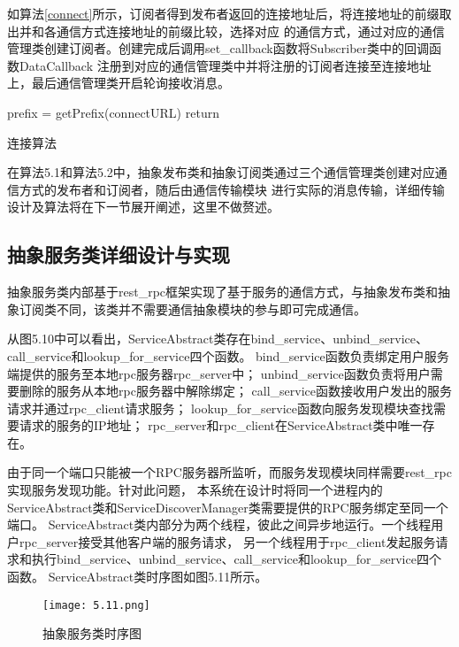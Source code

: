 如算法\ref{connect}所示，订阅者得到发布者返回的连接地址后，将连接地址的前缀取出并和各通信方式连接地址的前缀比较，选择对应
的通信方式，通过对应的通信管理类创建订阅者。创建完成后调用set\_callback函数将Subscriber类中的回调函数DataCallback
注册到对应的通信管理类中并将注册的订阅者连接至连接地址上，最后通信管理类开启轮询接收消息。
\begin{algorithm}
  \small
  \SetAlgoLined
  prefix = getPrefix(connectURL)\;
  return 
  \caption{连接算法}
  \label{connect}
\end{algorithm}
在算法5.1和算法5.2中，抽象发布类和抽象订阅类通过三个通信管理类创建对应通信方式的发布者和订阅者，随后由通信传输模块
进行实际的消息传输，详细传输设计及算法将在下一节展开阐述，这里不做赘述。

\subsection{抽象服务类详细设计与实现}
抽象服务类内部基于rest\_rpc框架实现了基于服务的通信方式，与抽象发布类和抽象订阅类不同，该类并不需要通信抽象模块的参与即可完成通信。

从图5.10中可以看出，ServiceAbstract类存在bind\_service、unbind\_service、call\_service和lookup\_for\_service四个函数。
bind\_service函数负责绑定用户服务端提供的服务至本地rpc服务器rpc\_server中；
unbind\_service函数负责将用户需要删除的服务从本地rpc服务器中解除绑定；
call\_service函数接收用户发出的服务请求并通过rpc\_client请求服务；
lookup\_for\_service函数向服务发现模块查找需要请求的服务的IP地址；
rpc\_server和rpc\_client在ServiceAbstract类中唯一存在。

由于同一个端口只能被一个RPC服务器所监听，而服务发现模块同样需要rest\_rpc实现服务发现功能。针对此问题，
本系统在设计时将同一个进程内的ServiceAbstract类和ServiceDiscoverManager类需要提供的RPC服务绑定至同一个端口。
ServiceAbstract类内部分为两个线程，彼此之间异步地运行。一个线程用户rpc\_server接受其他客户端的服务请求，
另一个线程用于rpc\_client发起服务请求和执行bind\_service、unbind\_service、call\_service和lookup\_for\_service四个函数。
ServiceAbstract类时序图如图5.11所示。
\begin{figure}[H]
  \centering
  \texttt{[image: 5.11.png]}
  \caption{抽象服务类时序图}
  \label{fig:11}
\end{figure}

